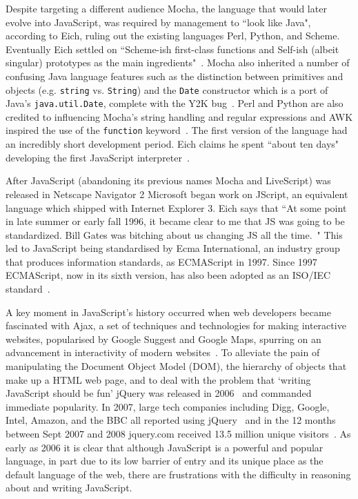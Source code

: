 \documentclass[]{final_report}
\begin{document}
Despite targeting a different audience Mocha, the language that would later evolve into JavaScript, was required by management to ``look like Java", according to Eich, ruling out the existing languages Perl, Python, and Scheme. Eventually Eich settled on ``Scheme-ish first-class functions and Self-ish (albeit singular) prototypes as the main ingredients"~\cite{popularityofjavascript}. Mocha also inherited a number of confusing Java language features such as the distinction between primitives and objects (e.g. \lstinline{string} vs. \lstinline{String}) and the \lstinline|Date| constructor which is a port of Java's \lstinline|java.util.Date|, complete with the Y2K bug~\cite{brendaneichtimetomakejscomment}. Perl and Python are also credited to influencing Mocha's string handling and regular expressions and AWK inspired the use of the \lstinline{function} keyword~\cite{briefhistoryofjavascript}. The first version of the language had an incredibly short development period. Eich claims he spent ``about ten days" developing the first JavaScript interpreter~\cite{AZProgrammingLanguages}.

After JavaScript (abandoning its previous names Mocha and LiveScript) was released in Netscape Navigator 2 Microsoft began work on JScript, an equivalent language which shipped with Internet Explorer 3. Eich says that ``At some point in late summer or early fall 1996, it became clear to me that JS was going to be standardized. Bill Gates was bitching about us changing JS all the time.~\cite{newjavascriptmoduleowner}" This led to JavaScript being standardised by Ecma International, an industry group that produces information standards, as ECMAScript in 1997. Since 1997 ECMAScript, now in its sixth version, has also been adopted as an ISO/IEC standard~\cite{ISO/IEC16262:2011}.

A key moment in JavaScript's history occurred when web developers became fascinated with Ajax, a set of techniques and technologies for making interactive websites, popularised by Google Suggest and Google Maps, spurring on an advancement in interactivity of modern websites~\cite{ajax}. To alleviate the pain of manipulating the Document Object Model (DOM), the hierarchy of objects that make up a HTML web page, and to deal with the problem that `writing JavaScript should be fun' jQuery was released in 2006~\cite{historyofjquery} and commanded immediate popularity. In 2007, large tech companies including Digg, Google, Intel, Amazon, and the BBC all reported using jQuery~\cite{historyofjquery} and in the 12 months between Sept 2007 and 2008 jquery.com received 13.5 million unique visitors~\cite{stateofjquery}. As early as 2006 it is clear that although JavaScript is a powerful and popular language, in part due to its low barrier of entry and its unique place as the default language of the web, there are frustrations with the difficulty in reasoning about and writing JavaScript.
\end{document}

